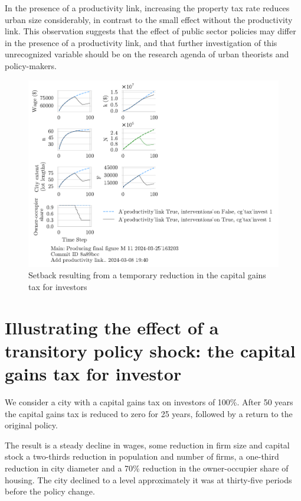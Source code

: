 In the presence of a productivity link, increasing the property tax rate reduces urban size considerably, in contrast to the small effect without the productivity link. This observation suggests that the effect of public sector policies may differ in the presence of a productivity link, and that further investigation of this unrecognized variable should be on the research agenda of urban theorists and policy-makers.


\begin{figure}[h!tb] 
    \centering
    \includegraphics[scale=1., trim={0 1.4cm 7cm 0},clip]{fig/interventions_on-cg_tax_invest-163203.pdf}  %
    \caption{Setback resulting from a temporary reduction in the capital gains tax for investors}
    \label{fig:cgtax_setback}
\end{figure}




\section{Illustrating the effect of a transitory policy shock: the capital gains tax for investor}
We consider a city with a capital gains tax on investors of 100\%. After 50 years the capital gains tax is reduced to zero for 25 years, followed by a return to the original policy.

The result is a steady decline in wages, some reduction in firm size and capital stock a two-thirds reduction in population and number of firms,  a one-third reduction in city diameter and a 70\% reduction in the owner-occupier share of housing. The city declined to a level approximately it was at thirty-five periods before the policy change.

